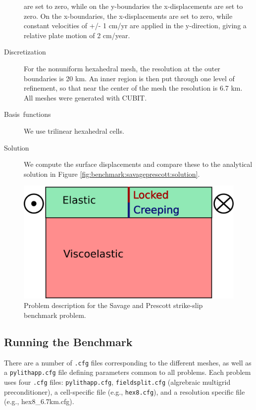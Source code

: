 \begin{description}
are set to zero, while on the y-boundaries the x-displacements are
set to zero. On the x-boundaries, the x-displacements are set to zero,
while constant velocities of +/- 1 cm/yr are applied in the y-direction,
giving a relative plate motion of 2 cm/year.
\item [Discretization] For the nonuniform hexahedral mesh, the resolution
at the outer boundaries is 20 km. An inner region is then put through
one level of refinement, so that near the center of the mesh the resolution
is 6.7 km. All meshes were generated with CUBIT.
\item [Basis~functions] We use trilinear hexahedral cells.
\item [Solution] We compute the surface displacements and compare these
to the analytical solution in Figure \ref{fig:benchmark:savageprescott:solution}.
\end{description}

\begin{figure}[htbp]
  \includegraphics[scale=0.33]{benchmarks/figs/savageprescott_diagram}
  \caption{Problem description for the Savage and Prescott strike-slip
    benchmark problem.}
  \label{fig:benchmark:savageprescott:geometry}
\end{figure}


\subsection{Running the Benchmark}

There are a number of {\tt .cfg} files corresponding to the
different meshes, as well as a {\tt pylithapp.cfg} file defining
parameters common to all problems. Each problem uses four
{\tt .cfg} files: {\tt pylithapp.cfg}, {\tt fieldsplit.cfg}
(algrebraic multigrid preconditioner), a cell-specific file (e.g.,
{\tt hex8.cfg}), and a resolution specific file (e.g.,
hex8\_6.7km.cfg).

